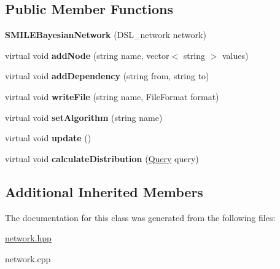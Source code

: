 \subsection*{Public Member Functions}
\begin{DoxyCompactItemize}
\item 
\hypertarget{classpct_1_1_s_m_i_l_e_bayesian_network_a25dd02f46bca3c668328bc82e9b28c29}{{\bfseries S\-M\-I\-L\-E\-Bayesian\-Network} (D\-S\-L\-\_\-network network)}\label{classpct_1_1_s_m_i_l_e_bayesian_network_a25dd02f46bca3c668328bc82e9b28c29}

\item 
\hypertarget{classpct_1_1_s_m_i_l_e_bayesian_network_aacc0635e0edf94c0dc5d2b6072d409fc}{virtual void {\bfseries add\-Node} (string name, vector$<$ string $>$ values)}\label{classpct_1_1_s_m_i_l_e_bayesian_network_aacc0635e0edf94c0dc5d2b6072d409fc}

\item 
\hypertarget{classpct_1_1_s_m_i_l_e_bayesian_network_a0c1f64f9bcc881cc2d7f0fdeeef68c06}{virtual void {\bfseries add\-Dependency} (string from, string to)}\label{classpct_1_1_s_m_i_l_e_bayesian_network_a0c1f64f9bcc881cc2d7f0fdeeef68c06}

\item 
\hypertarget{classpct_1_1_s_m_i_l_e_bayesian_network_a11ed702c942d6f2f81c3cdbb488b8341}{virtual void {\bfseries write\-File} (string name, File\-Format format)}\label{classpct_1_1_s_m_i_l_e_bayesian_network_a11ed702c942d6f2f81c3cdbb488b8341}

\item 
\hypertarget{classpct_1_1_s_m_i_l_e_bayesian_network_a9d9f695b9d62bff0348f28a84d58ee17}{virtual void {\bfseries set\-Algorithm} (string name)}\label{classpct_1_1_s_m_i_l_e_bayesian_network_a9d9f695b9d62bff0348f28a84d58ee17}

\item 
\hypertarget{classpct_1_1_s_m_i_l_e_bayesian_network_a20b8c919d3ef1e0ec9a93fba9c75e8d7}{virtual void {\bfseries update} ()}\label{classpct_1_1_s_m_i_l_e_bayesian_network_a20b8c919d3ef1e0ec9a93fba9c75e8d7}

\item 
\hypertarget{classpct_1_1_s_m_i_l_e_bayesian_network_af253de2afac4c80467f191dfdb344811}{virtual void {\bfseries calculate\-Distribution} (\hyperlink{classpct_1_1_query}{Query} query)}\label{classpct_1_1_s_m_i_l_e_bayesian_network_af253de2afac4c80467f191dfdb344811}

\end{DoxyCompactItemize}
\subsection*{Additional Inherited Members}


The documentation for this class was generated from the following files\-:\begin{DoxyCompactItemize}
\item 
\hyperlink{network_8hpp}{network.\-hpp}\item 
network.\-cpp\end{DoxyCompactItemize}
